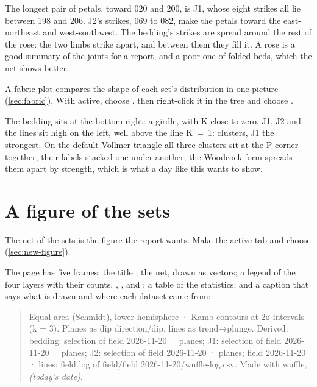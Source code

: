 
The longest pair of petals, toward 020 and 200, is J1, whose eight strikes all lie between 198 and 206.
J2's strikes, 069 to 082, make the petals toward the east-northeast and west-southwest. The bedding's
strikes are spread around the rest of the rose: the two limbs strike apart, and between them they fill
it. A rose is a good summary of the joints for a report, and a poor one of folded beds, which the net
shows better.

A fabric plot compares the shape of each set's distribution in one picture (\cref{sec:fabric}). With
 active, choose , then right-click it in the tree and choose
.


The bedding sits at the bottom right: a girdle, with K close to zero. J1, J2 and the lines sit high on
the left, well above the line K~=~1: clusters, J1 the strongest. On the default Vollmer triangle all three
clusters sit at the P corner together, their labels stacked one under another; the Woodcock form spreads
them apart by strength, which is what a day like this wants to show.

\section{A figure of the sets}\label{sec:wf-figure}

The net of the sets is the figure the report wants. Make  the active tab and choose
 (\cref{sec:new-figure}).


The page has five frames: the title ; the net, drawn as vectors; a legend of the four
layers with their counts, , ,  and
; a table of the statistics; and a caption that says what is drawn and
where each dataset came from:

\begin{quote}\small
Equal-area (Schmidt), lower hemisphere · Kamb contours at 2σ intervals (k = 3). Planes as dip
direction/dip, lines as trend→plunge. Derived: bedding: selection of field 2026-11-20 · planes; J1:
selection of field 2026-11-20 · planes; J2: selection of field 2026-11-20 · planes;
field 2026-11-20 · lines: field log of field/field 2026-11-20/wuffle-log.csv. Made with wuffle,
\textit{(today's date)}.
\end{quote}

